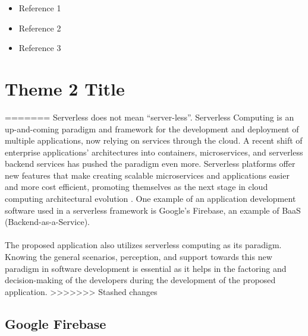 \begin{itemize}
	\item Reference 1 \cite{mutisya2017mobile}
	\item Reference 2 \cite{desale2020android}
	\item Reference 3 \cite{neubauer2021mobile}
\end{itemize}

\section{Theme 2 Title}
=======
Serverless does not mean “server-less”. Serverless Computing is an up-and-coming paradigm and framework for the development and deployment of multiple applications, now relying on services through the cloud. A recent shift of enterprise applications’ architectures into containers, microservices, and serverless backend services has pushed the paradigm even more. Serverless platforms offer new features that make creating scalable microservices and applications easier and more cost efficient, promoting themselves as the next stage in cloud computing architectural evolution \cite{castro2017serverless}. One example of an application development software used in a serverless framework is Google’s Firebase, an example of BaaS (Backend-as-a-Service).
\\\\The proposed application also utilizes serverless computing as its paradigm. Knowing the general scenarios, perception, and support towards this new paradigm in software development is essential as it helps in the factoring and decision-making of the developers during the development of the proposed application.
>>>>>>> Stashed changes

\subsection{Google Firebase}

